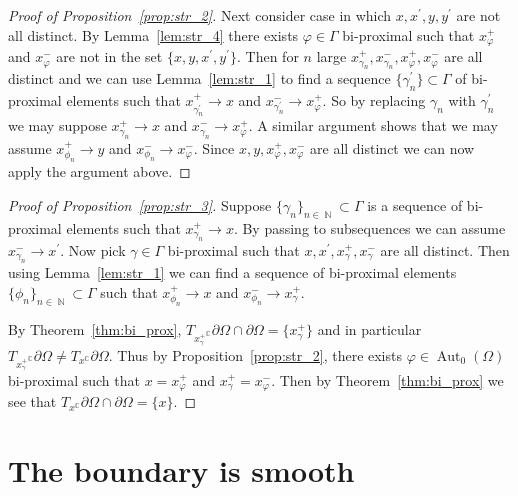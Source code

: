 \documentclass[12pt]{amsart}
\theoremstyle{plain}
\theoremstyle{definition}
\theoremstyle{remark}
\begin{document}
\begin{proof}[Proof of Proposition~\ref{prop:str_2}]
Next consider case in which $x,x^\prime, y,y^\prime$ are not all distinct. By Lemma~\ref{lem:str_4} there exists $\varphi \in \Gamma$ bi-proximal such that $x^+_{\varphi}$ and $x^-_{\varphi}$ are not in the set $\{x,y,x^\prime, y^\prime\}$. Then for $n$ large $x^+_{\gamma_n}, x^-_{\gamma_n}, x^+_{\varphi}, x^-_{\varphi}$ are all distinct and we can use Lemma~\ref{lem:str_1} to find a sequence $\{ \gamma_n^\prime \} \subset \Gamma$ of bi-proximal elements such that $x^+_{\gamma_n^\prime} \rightarrow x$ and $x^-_{\gamma_n^\prime} \rightarrow x^+_{\varphi}$. So by replacing $\gamma_n$ with $\gamma_n^\prime$ we may suppose $x^+_{\gamma_n} \rightarrow x$ and $x^-_{\gamma_n} \rightarrow x^+_{\varphi}$. A similar argument shows that we may assume $x^+_{\phi_n} \rightarrow y$ and $x^-_{\phi_n} \rightarrow x^-_{\varphi}$. Since $x,y,x^+_{\varphi}, x^-_{\varphi}$ are all distinct we can now apply the argument above.
\end{proof}

\begin{proof}[Proof of Proposition~\ref{prop:str_3}]
Suppose $\{\gamma_n\}_{n \in \operatorname{\mathbb{N}}} \subset \Gamma$ is a sequence of bi-proximal elements such that $x^+_{\gamma_n} \rightarrow x$. By passing to subsequences we can assume $x^-_{\gamma_n} \rightarrow x^\prime$. Now pick $\gamma \in \Gamma$ bi-proximal such that $x,x^\prime, x^+_{\gamma}, x^-_{\gamma}$ are all distinct. Then using Lemma~\ref{lem:str_1} we can find a sequence of bi-proximal elements $\{ \phi_n \}_{n \in \operatorname{\mathbb{N}}} \subset \Gamma$ such that $x^+_{\phi_n} \rightarrow x$ and $x^-_{\phi_n} \rightarrow x^+_{\gamma}$. 

By Theorem~\ref{thm:bi_prox}, $T_{x^+_{\gamma}}^\operatorname{\mathbb{C}} \partial \Omega \cap \partial \Omega = \{x^+_{\gamma}\}$ and in particular $T_{x^+_{\gamma}}^\operatorname{\mathbb{C}} \partial \Omega \neq T_{x}^\operatorname{\mathbb{C}} \partial \Omega$. Thus by Proposition~\ref{prop:str_2}, there exists $\varphi \in \operatorname{Aut}_0(\Omega)$ bi-proximal such that $x=x^+_{\varphi}$ and $x^+_{\gamma}=x^-_{\varphi}$. Then by Theorem~\ref{thm:bi_prox} we see that $T_x^\operatorname{\mathbb{C}} \partial \Omega \cap \partial \Omega = \{x\}$.
\end{proof}

\section{The boundary is smooth}\label{sec:smth}
\end{document}

